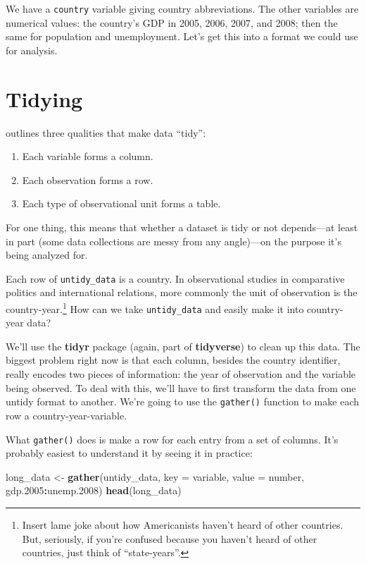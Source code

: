 \documentclass[12pt,oneside,openany]{book}
\newenvironment{Shaded}{\begin{snugshade}}{\end{snugshade}}
\newcommand{\KeywordTok}[1]{\textcolor[rgb]{0.13,0.29,0.53}{\textbf{#1}}}
\newcommand{\DataTypeTok}[1]{\textcolor[rgb]{0.13,0.29,0.53}{#1}}
\newcommand{\DecValTok}[1]{\textcolor[rgb]{0.00,0.00,0.81}{#1}}
\newcommand{\StringTok}[1]{\textcolor[rgb]{0.31,0.60,0.02}{#1}}
\newcommand{\OperatorTok}[1]{\textcolor[rgb]{0.81,0.36,0.00}{\textbf{#1}}}
\newcommand{\NormalTok}[1]{#1}
\providecommand{\tightlist}{%
  \setlength{\itemsep}{0pt}\setlength{\parskip}{0pt}}
\let\rmarkdownfootnote\footnote%
\def\footnote{\protect\rmarkdownfootnote}
\begin{document}
We have a \texttt{country} variable giving country abbreviations. The
other variables are numerical values: the country's GDP in 2005, 2006,
2007, and 2008; then the same for population and unemployment. Let's get
this into a format we could use for analysis.

\section{Tidying}\label{tidying}

\citet{Wickham:2014vp} outlines three qualities that make data ``tidy'':

\begin{enumerate}
\def\labelenumi{\arabic{enumi}.}
\tightlist
\item
  Each variable forms a column.
\item
  Each observation forms a row.
\item
  Each type of observational unit forms a table.
\end{enumerate}

For one thing, this means that whether a dataset is tidy or not
depends---at least in part (some data collections are messy from any
angle)---on the purpose it's being analyzed for.

Each row of \texttt{untidy\_data} is a country. In observational studies
in comparative politics and international relations, more commonly the
unit of observation is the country-year.\footnote{Insert lame joke about
  how Americanists haven't heard of other countries. But, seriously, if
  you're confused because you haven't heard of other countries, just
  think of ``state-years''.} How can we take \texttt{untidy\_data} and
easily make it into country-year data?

We'll use the \textbf{tidyr} package (again, part of \textbf{tidyverse})
to clean up this data. The biggest problem right now is that each
column, besides the country identifier, really encodes two pieces of
information: the year of observation and the variable being observed. To
deal with this, we'll have to first transform the data from one untidy
format to another. We're going to use the \texttt{gather()} function to
make each row a country-year-variable.

What \texttt{gather()} does is make a row for each entry from a set of
columns. It's probably easiest to understand it by seeing it in
practice:

\begin{Shaded}
\begin{Highlighting}[]
\NormalTok{long_data <-}\StringTok{ }\KeywordTok{gather}\NormalTok{(untidy_data,}
                    \DataTypeTok{key =}\NormalTok{ variable,}
                    \DataTypeTok{value =}\NormalTok{ number,}
\NormalTok{                    gdp.}\DecValTok{2005}\OperatorTok{:}\NormalTok{unemp.}\DecValTok{2008}\NormalTok{)}
\KeywordTok{head}\NormalTok{(long_data)}
\end{Highlighting}
\end{Shaded}
\end{document}
